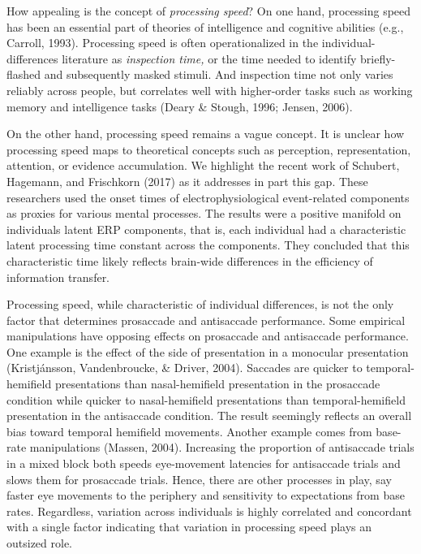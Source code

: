 \documentclass[
  ,man,floatsintext]{apa6}
\begin{document}
How appealing is the concept of \emph{processing speed}? On one hand, processing speed has been an essential part of theories of intelligence and cognitive abilities (e.g., Carroll, 1993). Processing speed is often operationalized in the individual-differences literature as \emph{inspection time,} or the time needed to identify briefly-flashed and subsequently masked stimuli. And inspection time not only varies reliably across people, but correlates well with higher-order tasks such as working memory and intelligence tasks (Deary \& Stough, 1996; Jensen, 2006).

On the other hand, processing speed remains a vague concept. It is unclear how processing speed maps to theoretical concepts such as perception, representation, attention, or evidence accumulation. We highlight the recent work of Schubert, Hagemann, and Frischkorn (2017) as it addresses in part this gap. These researchers used the onset times of electrophysiological event-related components as proxies for various mental processes. The results were a positive manifold on individuals latent ERP components, that is, each individual had a characteristic latent processing time constant across the components. They concluded that this characteristic time likely reflects brain-wide differences in the efficiency of information transfer.

Processing speed, while characteristic of individual differences, is not the only factor that determines prosaccade and antisaccade performance. Some empirical manipulations have opposing effects on prosaccade and antisaccade performance. One example is the effect of the side of presentation in a monocular presentation (Kristjánsson, Vandenbroucke, \& Driver, 2004). Saccades are quicker to temporal-hemifield presentations than nasal-hemifield presentation in the prosaccade condition while quicker to nasal-hemifield presentations than temporal-hemifield presentation in the antisaccade condition. The result seemingly reflects an overall bias toward temporal hemifield movements. Another example comes from base-rate manipulations (Massen, 2004). Increasing the proportion of antisaccade trials in a mixed block both speeds eye-movement latencies for antisaccade trials and slows them for prosaccade trials. Hence, there are other processes in play, say faster eye movements to the periphery and sensitivity to expectations from base rates. Regardless, variation across individuals is highly correlated and concordant with a single factor indicating that variation in processing speed plays an outsized role.
\end{document}
